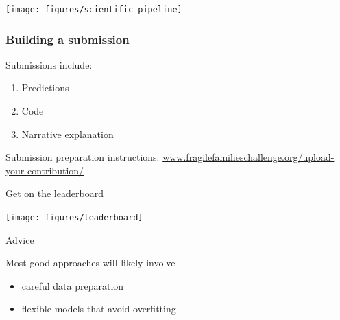 \documentclass{beamer}
\begin{document}
\begin{frame}

\begin{center}
\texttt{[image: figures/scientific\_pipeline]}
\end{center}

\end{frame}
\begin{frame}
\frametitle{Building a submission}

Submissions include:
\begin{enumerate}
\item Predictions
\item Code
\item Narrative explanation
\end{enumerate}

\vfill
Submission preparation instructions: \textcolor{blue}{\href{http://www.fragilefamilieschallenge.org/upload-your-contribution/}{www.fragilefamilieschallenge.org/upload-your-contribution/}}

\end{frame}
\begin{frame}{Get on the leaderboard}

\texttt{[image: figures/leaderboard]}

\end{frame}
\begin{frame}

\begin{center}
\LARGE{Advice}
\end{center}

\end{frame}
\begin{frame}

Most good approaches will likely involve \pause
\begin{itemize}
\item careful data preparation
\pause
\item flexible models that avoid overfitting
\end{itemize}

\end{frame}
\end{document}
